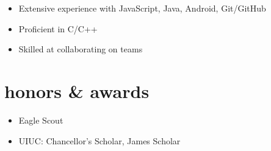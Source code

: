 \documentclass[nofooter]{resume}
\begin{document}
\noindent\begin{itemize}[leftmargin=0.45cm]
\setlength{\itemsep}{-5pt}
\item Extensive experience with JavaScript, Java, Android, Git/GitHub
\item Proficient in C/C++
\item Skilled at collaborating on teams
\end{itemize}\vspace{\parskip}


\section{honors \& awards}

\noindent\begin{itemize}[leftmargin=0.45cm]
\setlength{\itemsep}{-5pt}
\item Eagle Scout
\item UIUC: Chancellor's Scholar, James Scholar
\end{itemize}
\end{document}
